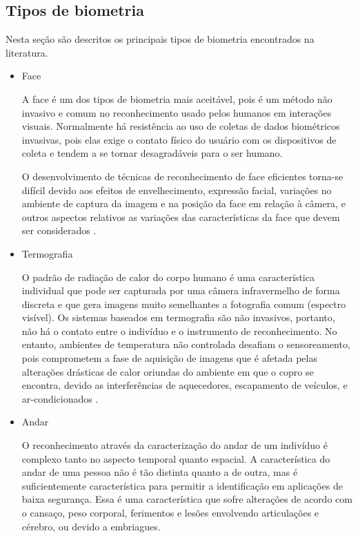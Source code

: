 \subsection{Tipos de biometria\label{secao:tiposdebiometria}}
Nesta seção são descritos os principais tipos de biometria encontrados na literatura.


\begin{itemize}
    
\item Face

  A face é um dos tipos de biometria mais aceitável, pois é um método não invasivo e comum no reconhecimento usado pelos humanos em interações visuais. Normalmente há resistência ao  uso de coletas de dados biométricos invasivas, pois elas exige o contato físico do usuário com os dispositivos de coleta e tendem a se tornar desagradáveis para o ser humano.
  
  O desenvolvimento de técnicas de reconhecimento de face eficientes torna-se difícil devido aos efeitos de envelhecimento, expressão facial, variações no ambiente de captura da imagem e na posição da face em relação à câmera, e outros aspectos relativos as variações das características da face que devem ser considerados \cite{maltoni2009handbook}.


\item Termografia

  O padrão de radiação de calor do corpo humano é uma característica individual que pode ser capturada por uma câmera infravermelho de forma discreta e que gera imagens muito semelhantes a fotografia comum (espectro visível). Os sistemas baseados em termografia são não invasivos, portanto, não há o contato entre o indivíduo e o instrumento de reconhecimento. No entanto, ambientes de temperatura não controlada desafiam o sensoreamento, pois comprometem a fase de aquisição de imagens que é afetada pelas alterações drásticas de calor oriundas do ambiente em que o copro se encontra, devido as interferências de aquecedores, escapamento de veículos, e ar-condicionados \cite{maltoni2009handbook}.


\item Andar

  O reconhecimento através da caracterização do andar de um indivíduo é complexo tanto no aspecto temporal quanto espacial. A característica do andar de uma pessoa não é tão distinta quanto a de outra, mas é suficientemente característica para permitir a identificação em aplicações de baixa segurança. Essa é uma característica que sofre alterações de acordo com o cansaço, peso corporal, ferimentos e lesões envolvendo articulações e cérebro, ou devido a embriagues\cite{maltoni2009handbook}.



\end{itemize}
